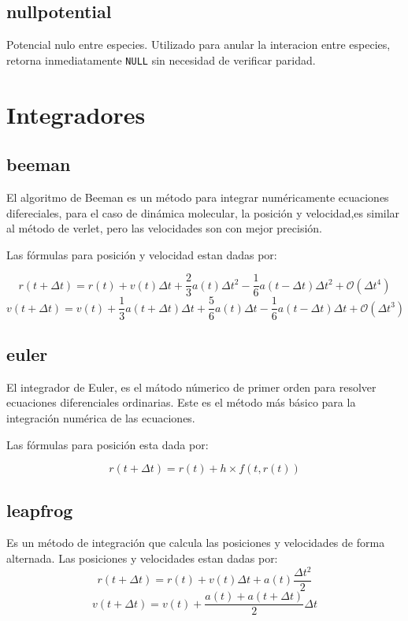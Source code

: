 \subsection{nullpotential}
Potencial nulo entre especies. Utilizado para anular la interacion entre especies, retorna inmediatamente \verb|NULL| sin necesidad de verificar paridad.

\section{Integradores}
\subsection{beeman}
El algoritmo de Beeman es un m\'etodo para integrar num\'ericamente ecuaciones difereciales, para el caso de din\'amica molecular, la posici\'on y velocidad,es similar al m\'etodo de verlet, pero las velocidades son con mejor precisi\'on.

Las f\'ormulas para posici\'on y velocidad estan dadas por:

$$r(t+\Delta t) = r(t) + v(t)\Delta t + \frac{2}{3}a(t)\Delta t^2 - \frac{1}{6}a(t-\Delta t)\Delta t^2 +\mathcal{O}(\Delta t^4)$$
$$v(t+\Delta t) = v(t) + \frac{1}{3}a(t+\Delta t)\Delta t+\frac{5}{6}a(t)\Delta t-\frac{1}{6}a(t-\Delta t)\Delta t+\mathcal{O}(\Delta t^3)$$

\subsection{euler}
El integrador de Euler, es el m\'atodo n\'umerico de primer orden para resolver ecuaciones diferenciales ordinarias. Este es el m\'etodo m\'as b\'asico para la integraci\'on num\'erica de las ecuaciones.

Las f\'ormulas para posici\'on esta dada por:

$$r(t+\Delta t) = r(t) + h\times f(t,r(t))$$

\subsection{leapfrog}
Es un m\'etodo de integraci\'on que calcula las posiciones y velocidades de forma alternada. Las posiciones y velocidades estan dadas por:
$$r(t+\Delta t) = r(t) + v(t)\Delta t + a(t)\frac{\Delta t^2}{2}$$
$$v(t+\Delta t) = v(t) + \frac{a(t)+a(t+\Delta t)}{2}\Delta t$$
